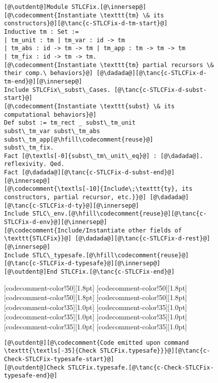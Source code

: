 \begin{figure}
\begin{minipage}{\textwidth}
\begin{multicols}{2}
\begin{lstlisting}
[@\outdent@]Module STLCFix.[@\innersep@]
[@\codecomment{Instantiate \texttt{tm} \& its constructors}@][@\tanc{c-STLCFix-d-tm-start}@]
Inductive tm : Set :=
| tm_unit : tm | tm_var : id -> tm
| tm_abs : id -> tm -> tm | tm_app : tm -> tm -> tm
| tm_fix : id -> tm -> tm.
[@\codecomment{Instantiate \texttt{tm} partial recursors \& their comp.\ behaviors}@] [@\dadada@][@\tanc{c-STLCFix-d-tm-end}@][@\innersep@]
Include STLCFix\_subst\_Cases. [@\tanc{c-STLCFix-d-subst-start}@]
[@\codecomment{Instantiate \texttt{subst} \& its computational behaviors}@]
Def subst := tm_rect _ subst\_tm_unit
subst\_tm_var subst\_tm_abs subst\_tm_app[@\hfill\codecomment{reuse}@]
subst\_tm_fix.
Fact [@\textls[-0]{subst\_tm\_unit\_eq}@] : [@\dadada@]. reflexivity. Qed.
Fact [@\dadada@][@\tanc{c-STLCFix-d-subst-end}@][@\innersep@]
[@\codecomment{\textls[-10]{Include\;\texttt{ty}, its constructors, partial recursor, etc.}}@] [@\dadada@][@\tanc{c-STLCFix-d-ty}@][@\innersep@]
Include STLC\_env.[@\hfill\codecomment{reuse}@][@\tanc{c-STLCFix-d-env}@][@\innersep@]
[@\codecomment{Include/Instantiate other fields of \texttt{STLCFix}}@] [@\dadada@][@\tanc{c-STLCFix-d-rest}@][@\innersep@]
Include STLC\_typesafe.[@\hfill\codecomment{reuse}@][@\tanc{c-STLCFix-d-typesafe}@][@\innersep@]
[@\outdent@]End STLCFix.[@\tanc{c-STLCFix-end}@]
\end{lstlisting}

[codecomment-color!50][1.8pt]
[codecomment-color!50][1.8pt]
[codecomment-color!50][1.8pt]
[codecomment-color!50][1.8pt]
[codecomment-color!35][1.0pt]
[codecomment-color!35][1.0pt]
[codecomment-color!35][1.0pt]
[codecomment-color!35][1.0pt]
[codecomment-color!35][1.0pt]
[codecomment-color!35][1.0pt]

\vspace{-3pt}


\begin{lstlisting}
[@\outdent@][@\codecomment{Code emitted upon command \texttt{\textls[-35]{Check STLCFix.typesafe}}}@][@\tanc{c-Check-STLCFix-typesafe-start}@]
[@\outdent@]Check STLCFix.typesafe.[@\tanc{c-Check-STLCFix-typesafe-end}@]
\end{lstlisting}


\end{multicols}
\end{minipage}
\end{figure}
